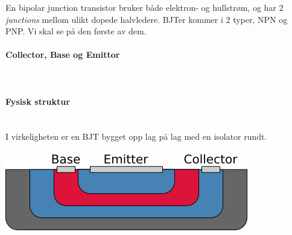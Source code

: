 En bipolar junction transistor bruker både elektron- og hullstrøm,
og har 2 \emph{junctions} mellom ulikt dopede halvledere.
BJTer kommer i 2 typer, NPN og PNP. Vi skal se på den første av dem.

\paragraph{Collector, Base og Emittor} \mbox{} \\


\paragraph{Fysisk struktur} \mbox{} \\
I virkeligheten er en BJT bygget opp lag på lag med en isolator rundt.
\\\\
\includegraphics{./img/npn-real}

